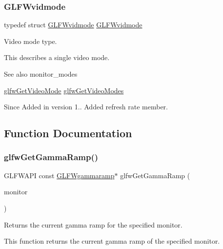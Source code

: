 \subsubsection{\texorpdfstring{G\+L\+F\+Wvidmode}{GLFWvidmode}}
{\footnotesize\ttfamily typedef struct \hyperlink{structGLFWvidmode}{G\+L\+F\+Wvidmode}  \hyperlink{structGLFWvidmode}{G\+L\+F\+Wvidmode}}



Video mode type. 

This describes a single video mode.

\begin{DoxySeeAlso}{See also}
monitor\+\_\+modes 

\hyperlink{group__monitor_gac234b63ec525c70d7e18ac84aca088c6}{glfw\+Get\+Video\+Mode} \hyperlink{group__monitor_ga811c28d61595e630774389985947c665}{glfw\+Get\+Video\+Modes}
\end{DoxySeeAlso}
\begin{DoxySince}{Since}
Added in version 1..  Added refresh rate member. 
\end{DoxySince}


\subsection{Function Documentation}
\mbox{\label{group__monitor_gaeeac9198f3c91b83440eed679441f76b}} 
\subsubsection{\texorpdfstring{glfw\+Get\+Gamma\+Ramp()}{glfwGetGammaRamp()}}
{\footnotesize\ttfamily G\+L\+F\+W\+A\+PI const \hyperlink{structGLFWgammaramp}{G\+L\+F\+Wgammaramp}$\ast$ glfw\+Get\+Gamma\+Ramp (\begin{DoxyParamCaption}\item[{\hyperlink{group__monitor_ga8d9efd1cde9426692c73fe40437d0ae3}{G\+L\+F\+Wmonitor} $\ast$}]{monitor }\end{DoxyParamCaption})}



Returns the current gamma ramp for the specified monitor. 

This function returns the current gamma ramp of the specified monitor.


